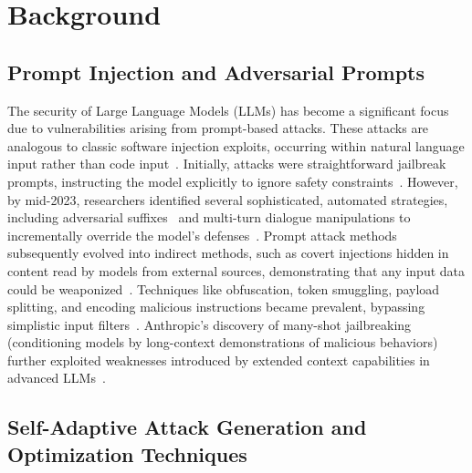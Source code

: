 \section{Background}

\subsection{Prompt Injection and Adversarial Prompts}

The security of Large Language Models (LLMs) has become a significant focus due to vulnerabilities arising from prompt-based attacks. These attacks are analogous to classic software injection exploits, occurring within natural language input rather than code input~\cite{arthur2024promptinjection, lakera2024promptguide}. Initially, attacks were straightforward jailbreak prompts, instructing the model explicitly to ignore safety constraints~\cite{arthur2024promptinjection}. However, by mid-2023, researchers identified several sophisticated, automated strategies, including adversarial suffixes~\cite{zou2023universal} and multi-turn dialogue manipulations to incrementally override the model's defenses~\cite{zou2024oneshot}. Prompt attack methods subsequently evolved into indirect methods, such as covert injections hidden in content read by models from external sources, demonstrating that any input data could be weaponized~\cite{lakera2024promptguide, venturebeat2024prompt}. Techniques like obfuscation, token smuggling, payload splitting, and encoding malicious instructions became prevalent, bypassing simplistic input filters~\cite{learnprompting2024obfuscation}. Anthropic’s discovery of many-shot jailbreaking (conditioning models by long-context demonstrations of malicious behaviors) further exploited weaknesses introduced by extended context capabilities in advanced LLMs~\cite{anthropic2024manyshot}.

\subsection{Self-Adaptive Attack Generation and Optimization Techniques}


